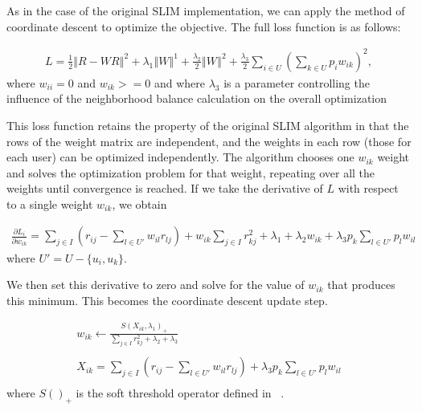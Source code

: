 As in the case of the original SLIM implementation, we can apply the method of coordinate descent to optimize the objective. The full loss function is as follows:

\begin{equation}
\begin{split}
 L = \frac{1}{2}\left\Vert R - WR \right\Vert^2 + 
    \lambda_1 \left\Vert W \right\Vert^1 + 
    \frac{\lambda_2}{2}\left\Vert W \right\Vert^2 +
    \frac{\lambda_3}{2}\sum_{i \in U}\left(\sum_{k \in U}p_iw_{ik}\right)^2,
\end{split}
\end{equation}
where $w_{ii}=0$ and $w_{ik}>=0$ and where $\lambda_3$ is a parameter controlling the influence of the neighborhood balance calculation on the overall optimization

This loss function retains the property of the original SLIM algorithm in that the rows of the weight matrix are independent, and the weights in each row (those for each user) can be optimized independently. The algorithm chooses one $w_{ik}$ weight and solves the optimization problem for that weight, repeating over all the weights until convergence is reached. If we take the derivative of $L$ with respect to a single weight $w_{ik}$, we obtain

\begin{equation}\label{eq:derivative}
\begin{split}
\frac{\partial L_i}{\partial w_{ik}} = \sum_{j \in I}{(r_{ij} - 
    \sum_{l \in U'}{w_{il}r_{lj}})} + w_{ik}\sum_{j \in I}{r_{kj}^2} + 
    \lambda_1 + \lambda_2w_{ik} + \lambda_3p_k\sum_{l \in U'}{p_lw_{il}} 
\end{split}
\end{equation}
where $U' = U - \{u_i, u_k\}$.

We then set this derivative to zero and solve for the value of $w_{ik}$ that produces this minimum. This becomes the coordinate descent update step. 

\begin{equation}\label{eq:update}
\begin{split}
    w_{ik} \leftarrow \frac{S\left(X_{ik}, \lambda_1\right)_+}
    {\sum_{j \in I}{r_{kj}^2} + \lambda_2 + \lambda_3} \\ \\
    X_{ik} = \sum_{j \in I}{(r_{ij} - 
    \sum_{l \in U'}{w_{il}r_{lj}})}+\lambda_3p_k\sum_{l \in U'}{p_lw_{il}}\\
\end{split}
\end{equation}
where $S()_+$ is the soft threshold operator defined in ~\cite{friedman_pathwise_2007}.

